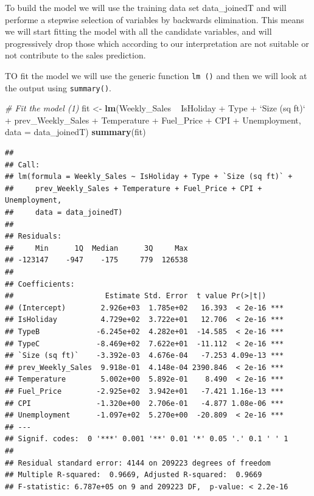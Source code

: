 \documentclass[11pt,]{article}
\newenvironment{Shaded}{\begin{snugshade}}{\end{snugshade}}
\newcommand{\KeywordTok}[1]{\textcolor[rgb]{0.13,0.29,0.53}{\textbf{{#1}}}}
\newcommand{\DataTypeTok}[1]{\textcolor[rgb]{0.13,0.29,0.53}{{#1}}}
\newcommand{\StringTok}[1]{\textcolor[rgb]{0.31,0.60,0.02}{{#1}}}
\newcommand{\CommentTok}[1]{\textcolor[rgb]{0.56,0.35,0.01}{\textit{{#1}}}}
\newcommand{\NormalTok}[1]{{#1}}
\begin{document}
To build the model we will use the training data set data\_joinedT and
will performe a stepwise selection of variables by backwards
elimination. This means we will start fitting the model with all the
candidate variables, and will progressively drop those which according
to our interpretation are not suitable or not contribute to the sales
prediction.

TO fit the model we will use the generic function \texttt{lm\ ()} and
then we will look at the output using \texttt{summary()}.

\begin{Shaded}
\begin{Highlighting}[]
\CommentTok{# Fit the model (1)}
\NormalTok{fit <-}\StringTok{ }\KeywordTok{lm}\NormalTok{(Weekly_Sales ~}\StringTok{ }\NormalTok{IsHoliday +}\StringTok{ }\NormalTok{Type +}\StringTok{ `}\DataTypeTok{Size (sq ft)}\StringTok{`} \NormalTok{+}\StringTok{ }
\StringTok{    }\NormalTok{prev_Weekly_Sales +}\StringTok{ }\NormalTok{Temperature +}\StringTok{ }\NormalTok{Fuel_Price +}\StringTok{ }\NormalTok{CPI +}\StringTok{ }\NormalTok{Unemployment, }
    \DataTypeTok{data =} \NormalTok{data_joinedT)}
\KeywordTok{summary}\NormalTok{(fit)}
\end{Highlighting}
\end{Shaded}

\begin{verbatim}
## 
## Call:
## lm(formula = Weekly_Sales ~ IsHoliday + Type + `Size (sq ft)` + 
##     prev_Weekly_Sales + Temperature + Fuel_Price + CPI + Unemployment, 
##     data = data_joinedT)
## 
## Residuals:
##     Min      1Q  Median      3Q     Max 
## -123147    -947    -175     779  126538 
## 
## Coefficients:
##                     Estimate Std. Error  t value Pr(>|t|)    
## (Intercept)        2.926e+03  1.785e+02   16.393  < 2e-16 ***
## IsHoliday          4.729e+02  3.722e+01   12.706  < 2e-16 ***
## TypeB             -6.245e+02  4.282e+01  -14.585  < 2e-16 ***
## TypeC             -8.469e+02  7.622e+01  -11.112  < 2e-16 ***
## `Size (sq ft)`    -3.392e-03  4.676e-04   -7.253 4.09e-13 ***
## prev_Weekly_Sales  9.918e-01  4.148e-04 2390.846  < 2e-16 ***
## Temperature        5.002e+00  5.892e-01    8.490  < 2e-16 ***
## Fuel_Price        -2.925e+02  3.942e+01   -7.421 1.16e-13 ***
## CPI               -1.320e+00  2.706e-01   -4.877 1.08e-06 ***
## Unemployment      -1.097e+02  5.270e+00  -20.809  < 2e-16 ***
## ---
## Signif. codes:  0 '***' 0.001 '**' 0.01 '*' 0.05 '.' 0.1 ' ' 1
## 
## Residual standard error: 4144 on 209223 degrees of freedom
## Multiple R-squared:  0.9669, Adjusted R-squared:  0.9669 
## F-statistic: 6.787e+05 on 9 and 209223 DF,  p-value: < 2.2e-16
\end{verbatim}
\end{document}
